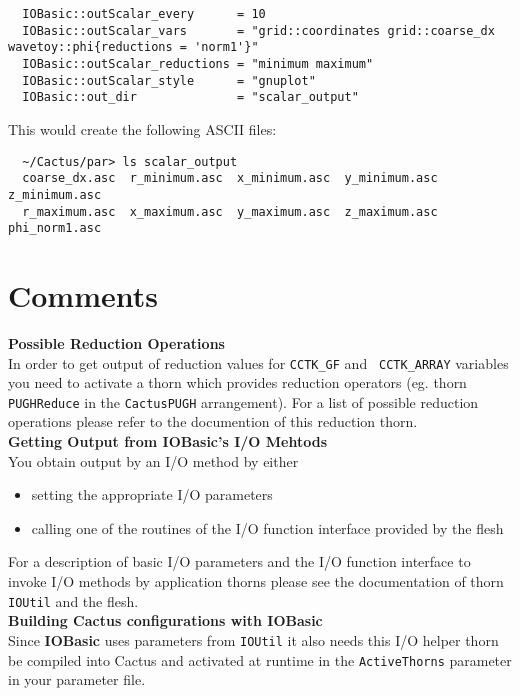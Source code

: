 \documentclass{article}
\begin{document}
\begin{verbatim}
  IOBasic::outScalar_every      = 10
  IOBasic::outScalar_vars       = "grid::coordinates grid::coarse_dx wavetoy::phi{reductions = 'norm1'}"
  IOBasic::outScalar_reductions = "minimum maximum"
  IOBasic::outScalar_style      = "gnuplot"
  IOBasic::out_dir              = "scalar_output"
\end{verbatim}
This would create the following ASCII files:
\begin{verbatim}
  ~/Cactus/par> ls scalar_output
  coarse_dx.asc  r_minimum.asc  x_minimum.asc  y_minimum.asc  z_minimum.asc
  r_maximum.asc  x_maximum.asc  y_maximum.asc  z_maximum.asc  phi_norm1.asc
\end{verbatim}
%
%
\section{Comments}
%
{\bf Possible Reduction Operations}\\
%
In order to get output of reduction values for {\tt CCTK\_GF} and {\tt
CCTK\_ARRAY} variables you need to activate a thorn which provides
reduction operators (eg. thorn {\tt PUGHReduce} in the {\tt CactusPUGH}
arrangement). For a list of possible reduction operations please refer to
the documention of this reduction thorn.\\[3ex]
%
{\bf Getting Output from {\bf IOBasic}'s I/O Mehtods}\\
%
You obtain output by an I/O method by either
%
\begin{itemize}
  \item setting the appropriate I/O parameters
  \item calling one of the routines of the I/O function interface
        provided by the flesh
\end{itemize}
%
For a description of basic I/O parameters and the I/O function interface to
invoke I/O methods by application thorns please see the documentation of thorn
{\tt IOUtil} and the flesh.\\[3ex]
%
%
{\bf Building Cactus configurations with {\bf IOBasic}}\\
%
Since {\bf IOBasic} uses parameters from {\tt IOUtil} it also needs this I/O
helper thorn be compiled into Cactus and activated at runtime in the
{\tt ActiveThorns} parameter in your parameter file.

\end{document}
